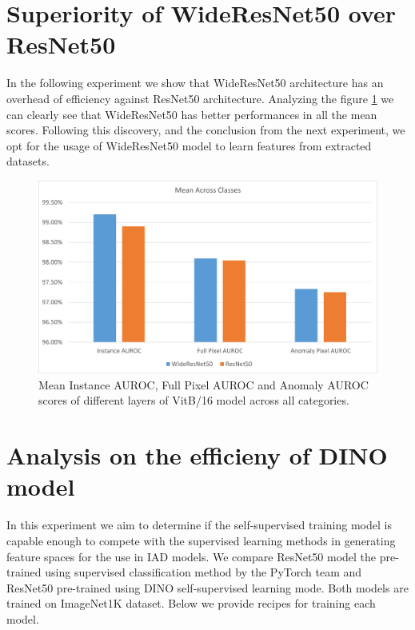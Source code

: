\section{Superiority of WideResNet50 over ResNet50}
In the following experiment we show that WideResNet50\cite{wideresnet} architecture has an overhead of efficiency against ResNet50 architecture. Analyzing the figure \ref{fig:resnet_vs_wideresnet} we can clearly see that WideResNet50 has better performances in all the mean scores. Following this discovery, and the conclusion from the next experiment, we opt for the usage of WideResNet50 model to learn features from extracted datasets.

\begin{figure}[t]
	\begin{center}
		\includegraphics[width=1.0\linewidth]{Chapter_4/resnet_vs_wideresnet.png}
	\end{center}
	\caption{Mean Instance AUROC, Full Pixel AUROC and Anomaly AUROC scores of different layers of VitB/16 model across all categories.}
	\label{fig:resnet_vs_wideresnet}
\end{figure}

\section{Analysis on the efficieny of DINO model}
\label{sec:dino_tests}
In this experiment we aim to determine if the self-supervised training model is capable enough to compete with the supervised learning methods in generating feature spaces for the use in IAD models. We compare ResNet50\cite{resnet} model the pre-trained using supervised classification method by the PyTorch team and ResNet50 pre-trained using DINO self-supervised learning mode. Both models are trained on ImageNet1K\cite{imagenet} dataset. Below we provide recipes for training each model.


